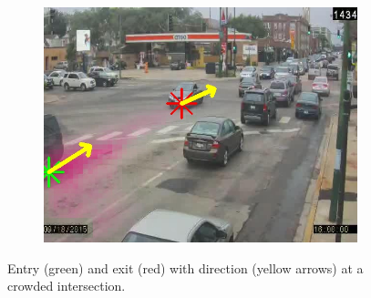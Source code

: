 \begin{figure}
\begin{subfigure}{0.32\linewidth}
            \includegraphics[width=\linewidth]{./img/scene_learning/res/diverseyWestern/diverseyWestern-5.jpg}
        \end{subfigure}
        \caption{Entry (green) and exit (red) with direction (yellow arrows) at a crowded intersection.}
        \label{fig:entry-exit-full-3}
\end{figure}